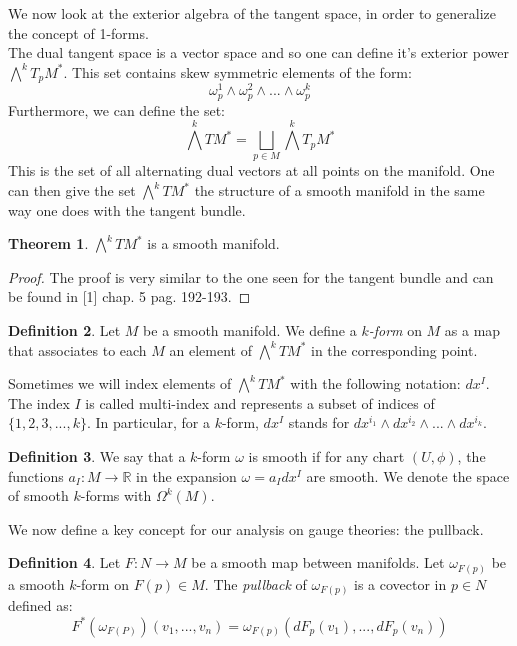 \documentclass[12pt,a4paper]{report}
\theoremstyle{definition}
\newtheorem{Def}{Definition}[chapter]
\theoremstyle{Theorem}
\newtheorem{Theo}[Def]{Theorem}
\theoremstyle{definition}
\theoremstyle{definition}
\begin{document}
	We now look at the exterior algebra of the tangent space, in order to generalize the concept of 1-forms.\\
	The dual tangent space is a vector space and so one can define it's exterior power $\bigwedge^k T_pM^*$. This set contains skew symmetric elements of the form:
	$$\omega^1_p\wedge \omega^2_p\wedge...\wedge \omega^k_p$$
	Furthermore, we can define the set:
	$$\bigwedge^k TM^*=\bigsqcup_{p\in M}\bigwedge^k T_pM^*$$
	This is the set of all alternating dual vectors at all points on the manifold. One can then give the set $\bigwedge^k TM^*$ the structure  of a smooth manifold in the same way one does with the tangent bundle.
	\begin{Theo}
		$\bigwedge^kTM^*$ is a smooth manifold.
	\end{Theo}
	\begin{proof}
		The proof is very similar to the one seen for the tangent bundle and can be found in [1] chap. 5 pag. 192-193.
	\end{proof}
	\begin{Def}
		Let $M$ be a smooth manifold. We define a \textit{$k$-form} on $M$ as a map that associates to each $M$ an element of $\bigwedge^k TM^*$ in the corresponding point. 
	\end{Def}
	Sometimes we will index elements of $\bigwedge^k TM^*$ with the following notation: $dx^I$. The index $I$ is called multi-index and represents a subset of indices of $\{1,2,3,...,k\}$. In particular, for a $k$-form, $dx^I$ stands for $dx^{i_1}\wedge dx^{i_2}\wedge...\wedge dx^{i_k}$.
	\begin{Def}
		We say that a $k$-form $\omega$ is smooth if for any chart $(U,\phi)$, the functions $a_I:M\rightarrow \mathbb{R}$ in the expansion $\omega=a_Idx^I$ are smooth.
		We denote the space of smooth $k$-forms with $\Omega^k(M)$. 
	\end{Def}
	We now define a key concept for our analysis on gauge theories: the pullback.
	\begin{Def}
		Let $F:N\rightarrow M$ be a smooth map between manifolds.
		Let $\omega_{F(p)}$ be a smooth $k$-form on $F(p)\in M$. The \textit{pullback} of $\omega_{F(p)}$ is a covector in $p\in N$ defined as:
		$$F^*(\omega_{F(P)})(v_1,...,v_n)=\omega_{F(p)}(dF_p(v_1),...,dF_p(v_n))$$ 
	\end{Def}
\end{document}
